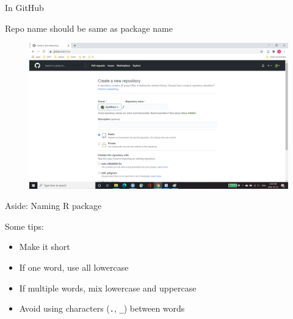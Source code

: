 \documentclass[
  ignorenonframetext,
]{beamer}
\providecommand{\tightlist}{%
  \setlength{\itemsep}{0pt}\setlength{\parskip}{0pt}}
\begin{document}
\begin{frame}{In GitHub}
\protect\hypertarget{in-github-2}{}

Repo name should be same as package name

\begin{figure}
  \includegraphics[scale=0.275]{slides_files/figure-beamer/GitHub_step3.png}
\end{figure}

\end{frame}

\begin{frame}[fragile]{Aside: Naming R package}
\protect\hypertarget{aside-naming-r-package}{}

Some tips:

\begin{itemize}
\tightlist
\item
  Make it short
\item
  If one word, use all lowercase
\item
  If multiple words, mix lowercase and uppercase
\item
  Avoid using characters (\texttt{.}, \texttt{\_}) between words
\end{itemize}

\end{frame}
\end{document}
